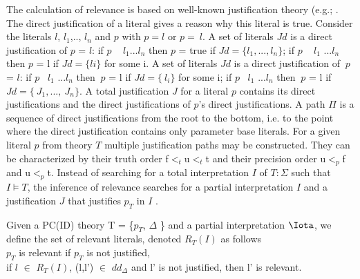 The calculation of relevance is based on well-known justification theory (e.g.; \cite{Denecker93, Denecker2015}.
The direct justification of a literal gives a reason why this literal is true.
Consider the literals $l$, $l_1$,.., $l_n$ and $p$ with $p=l$ or $p=~l$.
A set of literals $Jd$ is a direct justification of $p$ = $l$:
if $p$ \leftarrow ~ $l_1$\wedge...\wedge $l_n$ then $p$ = true if $Jd = \{l_1,...,l_n\}$;
if $p$ \leftarrow ~ $l_1$ \vee...\vee $l_n$ then $p$ = l if $Jd = \{li\}$ for some i.
A set of literals $Jd$ is a direct justification of $~p$ = $l$:
if $p$ \leftarrow ~$l_1$ \wedge...\wedge $l_n$ then $~p$ = l if $Jd = \{~l_i\}$ for some i;  
if $p$ \leftarrow ~$l_1$ \vee...\vee $l_n$ then $~p$ = l if $Jd = \{~J_1, ..., ~J_n\}$.
A total justification $J$ for a literal $p$ contains its direct justifications and the direct justifications of $p$'s direct justifications.
A path $\Pi$ is a sequence of direct justifications from the root to the bottom, i.e. to the point where the direct justification contains only parameter base literals.
For a given literal $p$ from theory $T$ multiple justification paths may be constructed.
They can be characterized by their truth order f$<_t$u$<_t$t and their precision order  u$<_p$f and u$<_p$t.
Instead of searching for a total interpretation $I$ of $T:\Sigma$ such that $I \models T$, the inference of relevance searches for a partial interpretation $I$ and a justification $J$ that justifies $p_T$ in $I$ \cite{Jansen2016}.
\begin{definition}
\label{def1}
\cite{Jansen2016}
Given a PC(ID) theory T = \{$p_T$, $\Delta$ \} and a partial interpretation $\Iota$, we define the set of relevant literals, denoted $R_T(I)$ as follows~\\
    \bullet $p_T$ is relevant if $p_T$ is not justified,~\\
    \bullet if $l$ $\in$ $R_T(I)$, (l,l') $\in$ $dd_\Delta$ and l' is not justified, then l' is relevant.
\end{definition}




